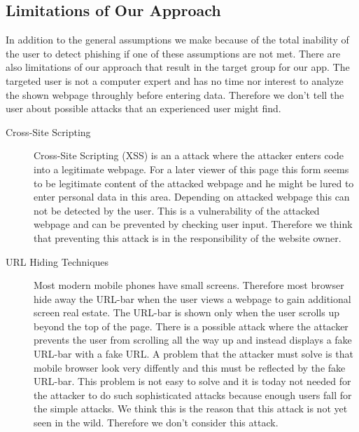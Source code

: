 \subsection{Limitations of Our Approach}
In addition to the general assumptions we make because of the total inability of the user to detect phishing if one of these assumptions are not met.
There are also limitations of our approach that result in the target group for our app.
The targeted user is not a computer expert and has no time nor interest to analyze the shown webpage throughly before entering data.
Therefore we don't tell the user about possible attacks that an experienced user might find.
\begin{description}
	\item[Cross-Site Scripting]
	Cross-Site Scripting (XSS) is an a attack where the attacker enters code into a legitimate webpage.
	For a later viewer of this page this form seems to be legitimate content of the attacked webpage and he might be lured to enter personal data in this area. 
	Depending on attacked webpage this can not be detected by the user.
	This is a vulnerability of the attacked webpage and can be prevented by checking user input.
	Therefore we think that preventing this attack is in the responsibility of the website owner.
	\item[URL Hiding Techniques]
	Most modern mobile phones have small screens.
	Therefore most browser hide away the URL-bar when the user views a webpage to gain additional screen real estate.
	The URL-bar is shown only when the user scrolls up beyond the top of the page.
	There is a possible attack where the attacker prevents the user from scrolling all the way up and instead displays a fake URL-bar with a fake URL.
	A problem that the attacker must solve is that mobile browser look very diffently and this must be reflected by the fake URL-bar.
	This problem is not easy to solve and it is today not needed for the attacker to do such sophisticated attacks because enough users fall for the simple attacks. 
	We think this is the reason that this attack is not yet seen in the wild.
	Therefore we don't consider this attack. 
\end{description}

